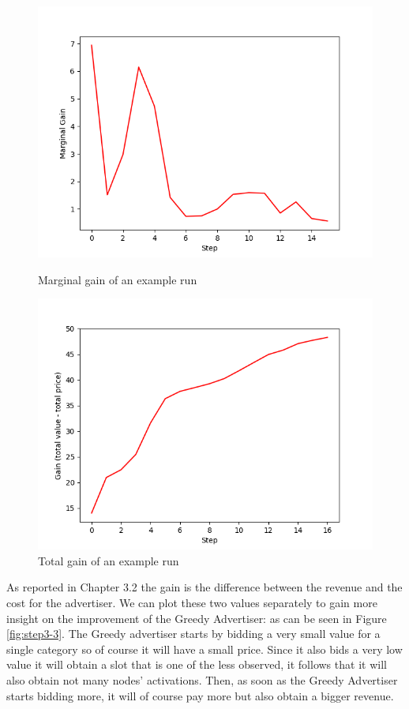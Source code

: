 \documentclass{article}
\begin{document}
\begin{figure}[H]
\begin{minipage}{0.48\textwidth}
\centering
\includegraphics[width=1\linewidth]{images/step3-1.png}
\caption{Marginal gain of an example run}
\label{fig:greedy_marginal_gain}
\end{minipage}
\begin{minipage}{0.48\textwidth}

\centering
\includegraphics[width=1\linewidth]{images/step3-2.png}
\caption{Total gain of an example run}
\label{fig:greedy_total_gain}
\end{minipage}
\end{figure}

As reported in Chapter 3.2 the gain is the difference between the revenue and the cost for the advertiser. We can plot these two values separately to gain more insight on the improvement of the Greedy Advertiser: as can be seen in Figure \ref{fig:step3-3}. The Greedy advertiser starts by bidding a very small value for a single category so of course it will have a small price. Since it also bids a very low value it will obtain a slot that is one of the less observed, it follows that it will also obtain not many nodes' activations. Then, as soon as the Greedy Advertiser starts bidding more, it will of course pay more but also obtain a bigger revenue.
\end{document}
